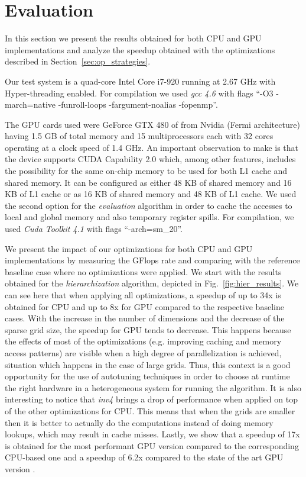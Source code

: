 \section{Evaluation}

In this section we present the results obtained for both CPU and GPU
implementations and analyze the speedup obtained with the optimizations
described in Section~\ref{sec:op_strategies}.

Our test system is a quad-core Intel Core i7-920 running at 2.67 GHz with
Hyper-threading enabled. For compilation we used \textit{gcc 4.6} with flags
``-O3 -march=native -funroll-loops -fargument-noalias -fopenmp''.

The GPU cards used were GeForce GTX 480 of from Nvidia (Fermi architecture)
having 1.5 GB of total memory and 15 multiprocessors each with 32 cores
operating at a clock speed of 1.4 GHz. An important observation to make is that
the device supports CUDA Capability 2.0 which, among other features, includes
the possibility for the same on-chip memory to be used for both L1 cache and shared
memory. It can be configured as either 48 KB of shared memory and 16 KB of L1
cache or as 16 KB of shared memory and 48 KB of L1 cache. We used the second
option for the \textit{evaluation} algorithm in order to cache the accesses to
local and global memory and also temporary register spills. For compilation, we
used \textit{Cuda Toolkit 4.1} with flags ``-arch=sm\_20''.

We present the impact of our optimizations for both CPU and GPU implementations
by measuring the GFlops rate and comparing with the reference baseline case
where no optimizations were applied. We start with the results obtained for the
\textit{hierarchization} algorithm, depicted in Fig.~\ref{fig:hier_results}. We
can see here that when applying all optimizations, a speedup of up to 34x is
obtained for CPU and up to 8x for GPU compared to the respective baseline cases.
With the increase in the number of dimensions and the decrease of the sparse
grid size, the speedup for GPU tends to decrease. This happens because the
effects of most of the optimizations (e.g. improving caching and memory access
patterns) are visible when a high degree of parallelization is achieved,
situation which happens in the case of large grids. Thus, this context is a good
opportunity for the use of autotuning techniques in order to choose at runtime
the right hardware in a heterogeneous system for running the algorithm. It is
also interesting to notice that \textit{inv4} brings a drop of performance when
applied on top of the other optimizations for CPU. This means that when the
grids are smaller then it is better to actually do the computations instead of
doing memory lookups, which may result in cache misses. Lastly, we show that a
speedup of 17x is obtained for the most performant GPU version compared to the
corresponding CPU-based one and a speedup of 6.2x compared to the state of the
art GPU version \cite{murarasu2011}.

